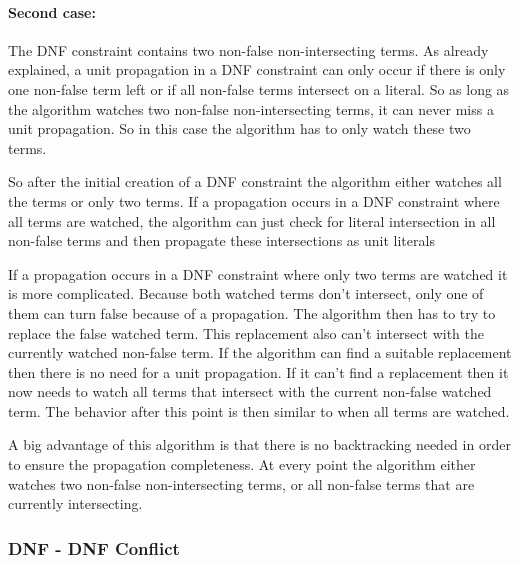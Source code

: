 \documentclass{easychair}
\begin{document}
\paragraph{Second case:} The DNF constraint contains two non-false non-intersecting terms. As already explained, a unit propagation in a DNF constraint can only occur if there is only one non-false term left or if all non-false terms intersect on a literal. So as long as the algorithm watches two non-false non-intersecting terms, it can never miss a unit propagation. So in this case the algorithm has to only watch these two terms.

So after the initial creation of a DNF constraint the algorithm either watches all the terms or only two terms. If a propagation occurs in a DNF constraint where all terms are watched, the algorithm can just check for literal intersection in all non-false terms and then propagate these intersections as unit literals

If a propagation occurs in a DNF constraint where only two terms are watched it is more complicated. Because both watched terms don't intersect, only one of them can turn false because of a propagation. The algorithm then has to try to replace the false watched term. This replacement also can't intersect with the currently watched non-false term. If the algorithm can find a suitable replacement then there is no need for a unit propagation. If it can't find a replacement then it now needs to watch all terms that intersect with the current non-false watched term. The behavior after this point is then similar to when all terms are watched.

A big advantage of this algorithm is that there is no backtracking needed in order to ensure the propagation completeness. At every point the algorithm either watches two non-false non-intersecting terms, or all non-false terms that are currently intersecting.



\subsubsection{DNF - DNF Conflict}
\end{document}
